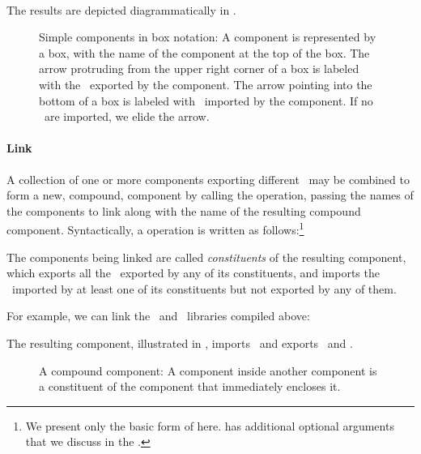 \\

The results are depicted diagrammatically
in .
\begin{figure}
\begin{center}

\end{center}
\caption{Simple components in box notation:
A component is represented by a box,
with the name of the component at the top of the box.
The arrow protruding from the upper right corner of a box
is labeled with the \apisN\ exported by the component.
The arrow pointing into the bottom of a box
is labeled with \apisN\ imported by the component.
If no \apisN\ are imported, we elide the arrow.}
\end{figure}

\paragraph{Link}

A collection of one or more components exporting different \apisN\
may be combined to form a new, compound, component
by calling the  operation,
passing the names of the components to link
along with the name of the resulting compound component.
Syntactically, a  operation is written as follows:\footnote{We
present only the basic form of  here.
\shellcommand{link} has additional optional arguments
that we discuss in the .}


The components being linked are called \emph{constituents}
of the resulting component,
which exports all the \apisN\ exported by any of its constituents,
and imports the \apisN\ imported by at least one of its constituents
but not exported by any of them.

For example,
we can link the \ironio\ and \ironcryp\ libraries
compiled above:


The resulting component,
illustrated in ,
imports \fortsec\ and exports \fortio\ and \fortcryp.
\begin{figure}
\begin{center}

\end{center}
\caption{A compound component:
A component inside another component
is a constituent of the component that immediately encloses it.}
\figlabel{simplelink}
\end{figure}

